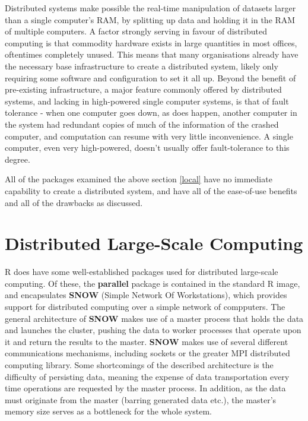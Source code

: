 \documentclass[a4paper,10pt]{article}
\begin{document}
Distributed systems make possible the real-time manipulation of datasets larger than a single computer's RAM, by splitting up data and holding it in the RAM of multiple computers.
A factor strongly serving in favour of distributed computing is that commodity hardware exists in large quantities in most offices, oftentimes completely unused.
This means that many organisations already have the necessary base infrastructure to create a distributed system, likely only requiring some software and configuration to set it all up.
Beyond the benefit of pre-existing infrastructure, a major feature commonly offered by distributed systems, and lacking in high-powered single computer systems, is that of fault tolerance - when one computer goes down, as does happen, another computer in the system had redundant copies of much of the information of the crashed computer, and computation can resume with very little inconvenience.
A single computer, even very high-powered, doesn't usually offer fault-tolerance to this degree.

All of the packages examined the above section \ref{local} have no immediate capability to create a distributed system, and have all of the ease-of-use benefits and all of the drawbacks as discussed.

\section{Distributed Large-Scale Computing}

R does have some well-established packages used for distributed large-scale computing.
Of these, the \textbf{parallel} package is contained in the standard R image, and encapsulates \textbf{SNOW} (Simple Network Of Workstations), which provides support for distributed computing over a simple network of compputers.
The general architecture of \textbf{SNOW} makes use of a master process that holds the data and launches the cluster, pushing the data to worker processes that operate upon it and return the results to the master. \textbf{SNOW} makes use of several different communications mechanisms, including sockets or the greater MPI distributed computing library.
Some shortcomings of the described architecture is the difficulty of persisting data, meaning the expense of data transportation every time operations are requested by the master process.
In addition, as the data must originate from the master (barring generated data etc.), the master's memory size serves as a bottleneck for the whole system.\\
\end{document}
